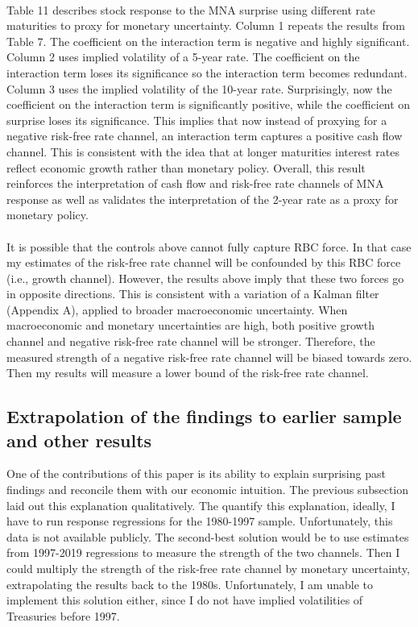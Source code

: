 \documentclass[12pt]{article}
\begin{document}
\paragraph{}
Table 11 describes stock response to the MNA surprise using different rate maturities to proxy for monetary uncertainty. Column 1 repeats the results from Table 7. The coefficient on the interaction term is negative and highly significant. Column 2 uses implied volatility of a 5-year rate. The coefficient on the interaction term loses its significance so the interaction term becomes redundant. Column 3 uses the implied volatility of the 10-year rate. Surprisingly, now the coefficient on the interaction term is significantly positive, while the coefficient on surprise loses its significance. This implies that now instead of proxying for a negative risk-free rate channel, an interaction term captures a positive cash flow channel. This is consistent with the idea that at longer maturities interest rates reflect economic growth rather than monetary policy. Overall, this result reinforces the interpretation of cash flow and risk-free rate channels of MNA response as well as validates the interpretation of the 2-year rate as a proxy for monetary policy.
\paragraph{}
It is possible that the controls above cannot fully capture RBC force. In that case my estimates of the risk-free rate channel will be confounded by this RBC force (i.e., growth channel). However, the results above imply that these two forces go in opposite directions. This is consistent with a variation of a Kalman filter (Appendix A), applied to broader macroeconomic uncertainty.  When macroeconomic and monetary uncertainties are high, both positive growth channel and negative risk-free rate channel will be stronger. Therefore, the measured strength of a negative risk-free rate channel will be biased towards zero. Then my results will measure a lower bound of the risk-free rate channel.

\subsection{Extrapolation of the findings to earlier sample and other results} \label{sec:Model}

One of the contributions of this paper is its ability to explain surprising past findings and reconcile them with our economic intuition. The previous subsection laid out this explanation qualitatively. The quantify this explanation, ideally, I have to run response regressions for the 1980-1997 sample. Unfortunately, this data is not available publicly. The second-best solution would be to use estimates from 1997-2019 regressions to measure the strength of the two channels. Then I could multiply the strength of the risk-free rate channel by monetary uncertainty, extrapolating the results back to the 1980s. Unfortunately, I am unable to implement this solution either, since I do not have implied volatilities of Treasuries before 1997.
\end{document}

